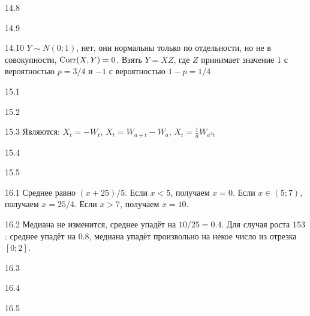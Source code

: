\protect \hypertarget {soln:14.8}{}
\begin{solution}{{14.8}}
\end{solution}
\protect \hypertarget {soln:14.9}{}
\begin{solution}{{14.9}}
\end{solution}
\protect \hypertarget {soln:14.10}{}
\begin{solution}{{14.10}}
  $Y \sim N(0;1)$, нет, они нормальны только по отдельности, но не в совокупности, $\operatorname{Corr}(X,Y)=0$. Взять $Y=XZ$, где $Z$ принимает значение $1$ с вероятностью $p=3/4$ и $-1$ с вероятностью $1-p=1/4$
\end{solution}
\protect \hypertarget {soln:15.1}{}
\begin{solution}{{15.1}}
\end{solution}
\protect \hypertarget {soln:15.2}{}
\begin{solution}{{15.2}}
\end{solution}
\protect \hypertarget {soln:15.3}{}
\begin{solution}{{15.3}}
Являются: $X_{t}=-W_{t}$, $X_{t}=W_{a+t}-W_{a}$, $X_{t}=\frac{1}{a}W_{a^{2}t}$
\end{solution}
\protect \hypertarget {soln:15.4}{}
\begin{solution}{{15.4}}
\end{solution}
\protect \hypertarget {soln:15.5}{}
\begin{solution}{{15.5}}
\end{solution}
\protect \hypertarget {soln:16.1}{}
\begin{solution}{{16.1}}
Среднее равно $(x+25)/5$. Если $x<5$, получаем $x=0$. Если $x \in (5; 7)$, получаем $x=25/4$. Если $x>7$, получаем $x=10$.
\end{solution}
\protect \hypertarget {soln:16.2}{}
\begin{solution}{{16.2}}
Медиана не изменится, среднее упадёт на $10/25=0.4$. Для случая роста $153$: среднее упадёт на $0.8$, медиана упадёт произвольно на некое число из отрезка $[0;2]$.
\end{solution}
\protect \hypertarget {soln:16.3}{}
\begin{solution}{{16.3}}
\end{solution}
\protect \hypertarget {soln:16.4}{}
\begin{solution}{{16.4}}
\end{solution}
\protect \hypertarget {soln:16.5}{}
\begin{solution}{{16.5}}
\end{solution}
\protect \hypertarget {soln:16.6}{}
